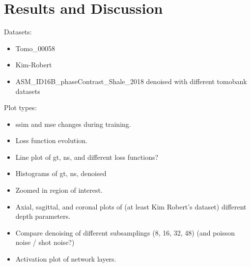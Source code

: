 \chapter{Results and Discussion}
\label{sec:results}

Datasets:
\begin{itemize}
    \item Tomo\_00058
    \item Kim-Robert
    \item ASM\_ID16B\_phaseContrast\_Shale\_2018 denoised with different tomobank datasets
\end{itemize}

Plot types: 
\begin{itemize}
    \item \acrshort{ssim} and \acrshort{mse} changes during training.
    \item Loss function evolution.
    \item Line plot of gt, ns, and different loss functions?
    \item Histograms of gt, ns, denoised
    \item Zoomed in region of interest.
    \item Axial, sagittal, and coronal plots of (at least Kim Robert's dataset) different depth parameters.
    \item Compare denoising of different subsamplings (8, 16, 32, 48) (and poisson noise / shot noise?)
    \item Activation plot of network layers.
\end{itemize}